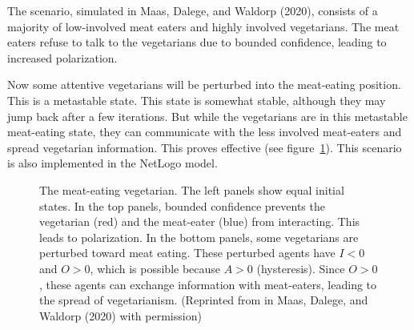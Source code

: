 \documentclass[
  a4paper,
  DIV=11,
  numbers=noendperiod,
  oneside]{scrreprt}
\begin{document}
The scenario, simulated in Maas, Dalege, and Waldorp (2020), consists of
a majority of low-involved meat eaters and highly involved vegetarians.
The meat eaters refuse to talk to the vegetarians due to bounded
confidence, leading to increased polarization.

Now some attentive vegetarians will be perturbed into the meat-eating
position. This is a metastable state. This state is somewhat stable,
although they may jump back after a few iterations. But while the
vegetarians are in this metastable meat-eating state, they can
communicate with the less involved meat-eaters and spread vegetarian
information. This proves effective (see
figure~\ref{fig-ch7-img12-old-100}). This scenario is also implemented
in the NetLogo model.

\begin{figure}


\caption{\label{fig-ch7-img12-old-100}The meat-eating vegetarian. The
left panels show equal initial states. In the top panels, bounded
confidence prevents the vegetarian (red) and the meat-eater (blue) from
interacting. This leads to polarization. In the bottom panels, some
vegetarians are perturbed toward meat eating. These perturbed agents
have \(I < 0\) and \(O > 0\), which is possible because \(A > 0\)
(hysteresis). Since \(O > 0\), these agents can exchange information
with meat-eaters, leading to the spread of vegetarianism. (Reprinted
from in Maas, Dalege, and Waldorp (2020) with permission)}

\end{figure}%
\end{document}
